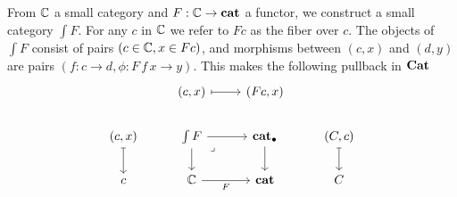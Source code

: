 \begin{defn}
  From $\mathbb{C}$ a small category and $F : \mathbb{C} \to \mathbf{cat}$
  a functor, we construct a small category $\int F$.
  For any $c$ in $\mathbb{C}$ we refer to $F c$ as the fiber over $c$.
  The objects of $\int F$ consist of pairs $(c \in \mathbb{C}, x \in F c)$,
  and morphisms between $(c, x)$ and $(d, y)$
  are pairs $(f : c \to d, \phi : F \, f \, x \to y)$.
  This makes the following pullback in $\mathbf{Cat}$
  \[\begin{tikzcd}
    & {(c,x)} & {(Fc, x)} \\
    {(c,x)} & {\int F} & \ptcat & {(C,c)} \\
    c & \catC & \cat & C \\
    & {}
    \arrow[maps to, from=1-2, to=1-3]
    \arrow[maps to, from=2-1, to=3-1]
    \arrow[from=2-2, to=2-3]
    \arrow[from=2-2, to=3-2]
    \arrow["\lrcorner"{anchor=center, pos=0.125}, draw=none, from=2-2, to=3-3]
    \arrow[from=2-3, to=3-3]
    \arrow[maps to, from=2-4, to=3-4]
    \arrow["F"', from=3-2, to=3-3]
  \end{tikzcd}\]
\end{defn}

\medskip

